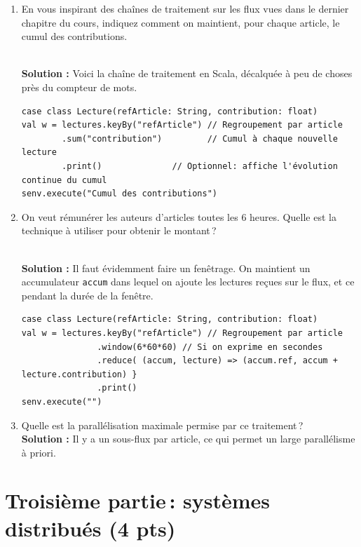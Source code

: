 \documentclass[11pt,a4paper]{article}
\newenvironment{solution}[0]{
~\\ \color{red} \textbf{Solution : }\color{black}}{%
}
\begin{document}
\begin{enumerate}
\item En vous inspirant des chaînes de traitement sur les flux vues dans le dernier chapitre
du cours, indiquez comment on maintient, pour chaque article, le cumul des contributions.

\begin{solution}
Voici la chaîne de traitement en Scala, décalquée à peu de choses près du compteur de mots.
\begin{small}
\begin{verbatim}
case class Lecture(refArticle: String, contribution: float)
val w = lectures.keyBy("refArticle") // Regroupement par article
        .sum("contribution")         // Cumul à chaque nouvelle lecture
        .print()              // Optionnel: affiche l'évolution continue du cumul
senv.execute("Cumul des contributions")
\end{verbatim}
\end{small}
\end{solution}

\item On veut rémunérer les auteurs d'articles toutes les 6 heures. Quelle est 
   la technique à utiliser pour obtenir le montant\,?
   
\begin{solution}
Il faut évidemment faire un fenêtrage. On maintient un accumulateur \texttt{accum}
dans lequel on ajoute les lectures reçues sur le flux, et ce pendant la durée de la fenêtre.
\begin{small}
\begin{verbatim}
case class Lecture(refArticle: String, contribution: float)
val w = lectures.keyBy("refArticle") // Regroupement par article
               .window(6*60*60) // Si on exprime en secondes
               .reduce( (accum, lecture) => (accum.ref, accum + lecture.contribution) }
               .print()
senv.execute("")
\end{verbatim}
\end{small}
\end{solution}

  \item Quelle est la parallélisation maximale permise par ce traitement\,?
\begin{solution}
Il y a un sous-flux par article, ce qui permet un large parallélisme à priori.
\end{solution}
\end{enumerate}

\section*{Troisième partie\,: systèmes distribués (4 pts)}
\end{document}
